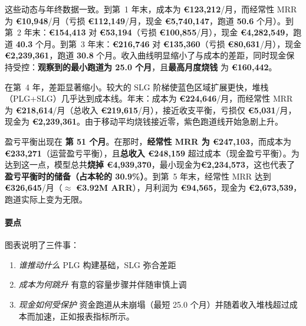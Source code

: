 \documentclass[11pt, a4paper, oneside]{article}
\begin{document}
这些动态与年终数据一致。到第~1 年末，成本为 \textbf{€123{,}212}/月，而经常性 MRR 为 \textbf{€10{,}948}/月（亏损 \textbf{€112{,}149}/月，现金 \textbf{€5{,}740{,}147}，跑道 \textbf{50.6} 个月）。到第~2 年末：\textbf{€154{,}413} 对 \textbf{€53{,}194}（亏损 \textbf{€100{,}855}/月），现金 \textbf{€4{,}282{,}549}，跑道 \textbf{40.3} 个月。到第~3 年末：\textbf{€216{,}746} 对 \textbf{€135{,}360}（亏损 \textbf{€80{,}631}/月），现金 \textbf{€2{,}239{,}361}，跑道 \textbf{30.8} 个月。收入曲线明显缩小了与成本的差距，同时现金保持受控：\textbf{观察到的最小跑道为 25.0 个月}，且\textbf{最高月度烧钱} 为 \textbf{€160{,}442}。

在第~4 年，差距显著缩小。较大的 SLG 阶梯使蓝色区域扩展更快，堆栈（PLG+SLG）几乎达到成本线。年末：成本为 \textbf{€224{,}646}/月，而经常性 MRR 为 \textbf{€218{,}614}/月（总收入 \textbf{€219{,}615}/月），接近收支平衡，亏损仅 \textbf{€5{,}031}/月，现金为 \textbf{€2{,}239{,}361}。由于移动平均烧钱接近零，紫色跑道线开始急剧上升。

盈亏平衡出现在 \textbf{第 51 个月}。在那时，\textbf{经常性 MRR 为 €247{,}103}，而成本为 \textbf{€233{,}271}（运营盈亏平衡），且\textbf{总收入 €248{,}159} 超过成本（现金盈亏平衡）。为达到这一点，模型总共\textbf{烧掉 €4{,}939{,}370}，最小现金为\textbf{€2{,}234{,}573}，这也代表了\textbf{盈亏平衡时的储备（占本轮的 30.9\%）}。到第~5 年末，经常性 MRR 达到 \textbf{€326{,}645}/月（$\approx$ \textbf{€3.92M ARR}），月利润为 \textbf{€94{,}565}，现金为 \textbf{€2{,}673{,}539}，跑道实际上变为无限。



\paragraph{要点}
图表说明了三件事：
\begin{enumerate}
\item \emph{谁推动什么} PLG 构建基础，SLG 弥合差距
\item \emph{成本为何跳升} 有意的容量步骤并伴随审慎上调
\item \emph{现金如何受保护} 资金跑道从未崩塌（最短 25.0 个月）并随着收入堆栈超过成本而加速，正如报表指标所示。
\end{enumerate}
\end{document}
